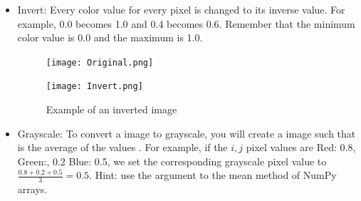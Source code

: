 \begin{itemize}
\item Invert:
Every color value for every pixel is changed to its inverse value.
For example, 0.0 becomes 1.0 and 0.4 becomes 0.6.
Remember that the minimum color value is 0.0 and the maximum is 1.0.

\vfill
\begin{figure}[ht]
\begin{minipage}[b]{0.47\linewidth}
\centering
\texttt{[image: Original.png]}
\end{minipage}
\hspace{0.1cm}
\begin{minipage}[b]{0.47\linewidth}
\centering
\texttt{[image: Invert.png]}
\end{minipage}
\caption{Example of an inverted image}
\end{figure}
\vfill

\item Grayscale:
To convert a  image  to grayscale, you will create a  image  such that  is the average of the values .
For example, if the $i,j$ pixel values are Red: 0.8, Green:, 0.2 Blue: 0.5, we set the 
corresponding grayscale pixel value to $\frac{0.8+0.2+0.5}{3} = 0.5$.
Hint: use the  argument to the mean method of NumPy arrays.


\end{itemize}
